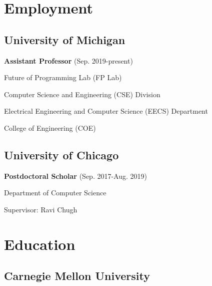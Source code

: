 \documentclass[10pt,letterpaper]{article}
\renewenvironment{itemize}{
  \begin{list}{}{
    \setlength{\leftmargin}{1.25em}
    \setlength{\itemsep}{0.25em}
    \setlength{\parskip}{0pt}
    \setlength{\parsep}{0.2em}
  }
}{
  \end{list}
}
\begin{document}
\section*{Employment}

\subsection*{University of Michigan}
  \begin{itemize}
    \item \textbf{Assistant Professor} (Sep. 2019-present)
    \item Future of Programming Lab (FP Lab)
    \item Computer Science and Engineering (CSE) Division
    \item Electrical Engineering and Computer Science (EECS) Department
    \item College of Engineering (COE)
  \end{itemize}

\subsection*{University of Chicago}
  \begin{itemize}
    \item \textbf{Postdoctoral Scholar} (Sep. 2017-Aug. 2019)
    \item Department of Computer Science
    \item Supervisor: Ravi Chugh
  \end{itemize}


\section*{Education}

\subsection*{Carnegie Mellon University}
\end{document}
